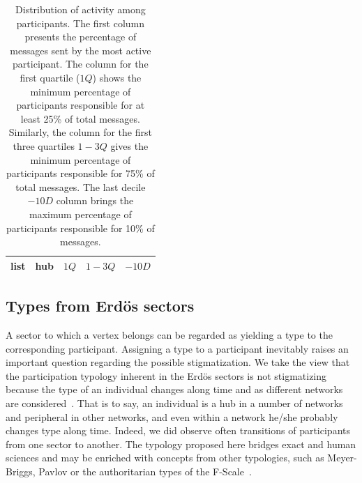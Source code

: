 \documentclass[%
	aip,
	jmp,%
	amsmath,amssymb,
	reprint,%
]{revtex4-1}
\begin{document}
\begin{table}[h]
	\caption{Distribution of activity among participants. The first column presents the percentage of messages sent by the most active participant. The column for the first quartile ($1Q$) shows the minimum percentage of participants responsible for at least 25\% of total messages. Similarly, the column for the first three quartiles $1-3Q$ gives the minimum percentage of participants responsible for 75\% of total messages. The last decile $-10D$ column brings the maximum percentage of participants responsible for 10\% of messages.}
	\begin{center}
		\begin{tabular}{ | l ||  c | c | c | c | }
			\hline
			list & hub & $ 1Q $ & $ 1-3Q $ & $-10D$ \\ \hline
			
		\end{tabular}
	\end{center}
	\label{autores}
\end{table}

\subsection{Types from Erd\"os sectors}\label{sec:pty}
A sector to which a vertex belongs can be regarded as yielding a type to the corresponding participant.
Assigning a type to a participant inevitably raises an important question regarding the possible stigmatization. 
We take the view that the participation typology inherent in the Erd\"os sectors is not stigmatizing because the type of an individual changes along time and as different networks are considered~\cite{adorno}. 
That is to say, an individual is a hub in a number of networks and peripheral in other networks, and even within a network he/she probably changes type along time. 
Indeed, we did observe often transitions of participants from one sector to another.
The typology proposed here bridges exact and human sciences and may be enriched with concepts from other typologies, such as Meyer-Briggs, Pavlov or the authoritarian types of the F-Scale~\cite{adorno}.
\end{document}
